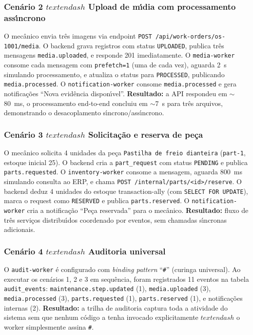 \documentclass[10pt,a4paper]{article}
\begin{document}
\subsubsection*{Cen\'ario 2 \(textendash\) Upload de m\'\i dia com processamento ass\'\i ncrono}

O mec\^anico envia tr\^es imagens via endpoint \texttt{POST /api/work-orders/os-1001/media}. O backend grava registros com status \texttt{UPLOADED}, publica tr\^es mensagens \texttt{media.uploaded}, e responde 201 imediatamente. O \texttt{media-worker} consome cada mensagem com \texttt{prefetch=1} (uma de cada vez), aguarda 2~s simulando processamento, e atualiza o status para \texttt{PROCESSED}, publicando \texttt{media.processed}. O \texttt{notification-worker} consome \texttt{media.processed} e gera notifica\c{c}\~oes ``Nova evid\^encia dispon\'\i vel''. \textbf{Resultado:} a API respondeu em $\sim$80~ms, o processamento end-to-end concluiu em $\sim$7~s para tr\^es arquivos, demonstrando o desacoplamento s\'\i ncrono/ass\'\i ncrono.

\subsubsection*{Cen\'ario 3 \(textendash\) Solicita\c{c}\~ao e reserva de pe\c{c}a}

O mec\^anico solicita 4 unidades da pe\c{c}a \texttt{Pastilha de freio dianteira} (\texttt{part-1}, estoque inicial 25). O backend cria a \texttt{part\_request} com status \texttt{PENDING} e publica \texttt{parts.requested}. O \texttt{inventory-worker} consome a mensagem, aguarda 800~ms simulando consulta ao ERP, e chama \texttt{POST /internal/parts/<id>/reserve}. O backend deduz 4 unidades do estoque transaction-ally (com \texttt{SELECT FOR UPDATE}), marca o request como \texttt{RESERVED} e publica \texttt{parts.reserved}. O \texttt{notification-worker} cria a notifica\c{c}\~ao ``Pe\c{c}a reservada'' para o mec\^anico. \textbf{Resultado:} fluxo de tr\^es servi\c{c}os distribu\'\i dos coordenado por eventos, sem chamadas s\'\i ncronas adicionais.

\subsubsection*{Cen\'ario 4 \(textendash\) Auditoria universal}

O \texttt{audit-worker} \'e configurado com \emph{binding pattern} ``\texttt{\#}'' (curinga universal). Ao executar os cen\'arios 1, 2 e 3 em sequ\^encia, foram registrados 11 eventos na tabela \texttt{audit\_events}: \texttt{maintenance.step.updated} (1), \texttt{media.uploaded} (3), \texttt{media.processed} (3), \texttt{parts.requested} (1), \texttt{parts.reserved} (1), e notifica\c{c}\~oes internas (2). \textbf{Resultado:} a trilha de auditoria captura toda a atividade do sistema sem que nenhum c\'odigo a tenha invocado explicitamente \(textendash\) o worker simplesmente assina \texttt{\#}.
\end{document}
